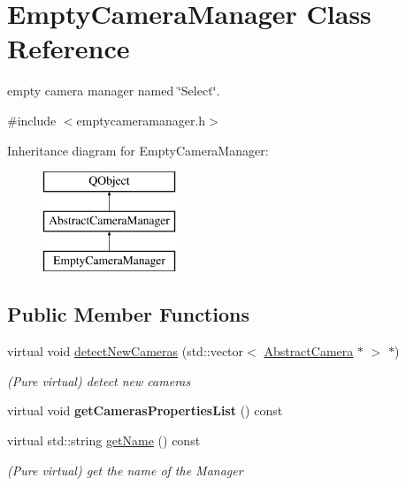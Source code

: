 \hypertarget{class_empty_camera_manager}{\section{Empty\-Camera\-Manager Class Reference}
\label{class_empty_camera_manager}
}


empty camera manager named \char`\"{}\-Select\char`\"{}.  




{\ttfamily \#include $<$emptycameramanager.\-h$>$}

Inheritance diagram for Empty\-Camera\-Manager\-:\begin{figure}[H]
\begin{center}
\leavevmode
\includegraphics[height=3.000000cm]{class_empty_camera_manager}
\end{center}
\end{figure}
\subsection*{Public Member Functions}
\begin{DoxyCompactItemize}
\item 
virtual void \hyperlink{class_empty_camera_manager_ae32a44d1576763cf49d46dba3aef0007}{detect\-New\-Cameras} (std\-::vector$<$ \hyperlink{class_abstract_camera}{Abstract\-Camera} $\ast$ $>$ $\ast$)
\begin{DoxyCompactList}\small\item\em (Pure virtual) detect new cameras \end{DoxyCompactList}\item 
\hypertarget{class_empty_camera_manager_a321c93993d5bdd065f9ea875ee7b7961}{virtual void {\bfseries get\-Cameras\-Properties\-List} () const }\label{class_empty_camera_manager_a321c93993d5bdd065f9ea875ee7b7961}

\item 
virtual std\-::string \hyperlink{class_empty_camera_manager_acd29e9bb06b9839e5c94b6ffe5ee86a9}{get\-Name} () const 
\begin{DoxyCompactList}\small\item\em (Pure virtual) get the name of the Manager \end{DoxyCompactList}\end{DoxyCompactItemize}
